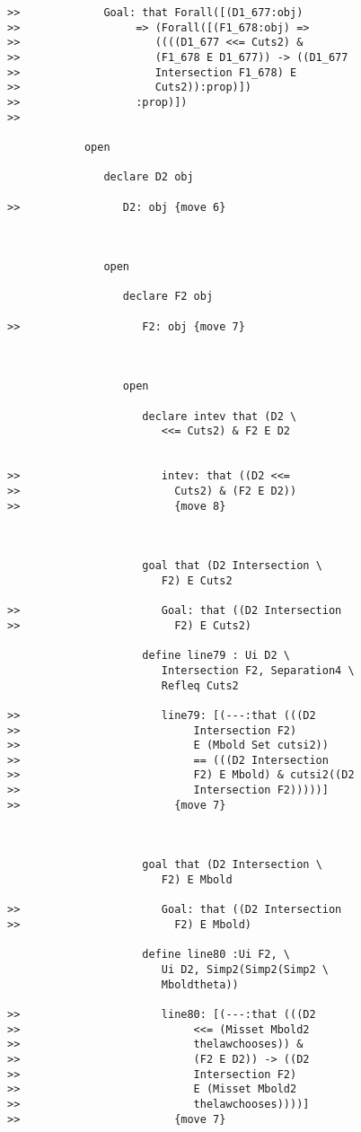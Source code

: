\documentclass[12pt]{article}
\begin{document}
\begin{verbatim}
>>             Goal: that Forall([(D1_677:obj)
>>                  => (Forall([(F1_678:obj) =>
>>                     ((((D1_677 <<= Cuts2) &
>>                     (F1_678 E D1_677)) -> ((D1_677
>>                     Intersection F1_678) E
>>                     Cuts2)):prop)])
>>                  :prop)])
>>               

            open

               declare D2 obj

>>                D2: obj {move 6}



               open

                  declare F2 obj

>>                   F2: obj {move 7}



                  open

                     declare intev that (D2 \
                        <<= Cuts2) & F2 E D2


>>                      intev: that ((D2 <<=
>>                        Cuts2) & (F2 E D2))
>>                        {move 8}



                     goal that (D2 Intersection \
                        F2) E Cuts2

>>                      Goal: that ((D2 Intersection
>>                        F2) E Cuts2)

                     define line79 : Ui D2 \
                        Intersection F2, Separation4 \
                        Refleq Cuts2

>>                      line79: [(---:that (((D2
>>                           Intersection F2)
>>                           E (Mbold Set cutsi2))
>>                           == (((D2 Intersection
>>                           F2) E Mbold) & cutsi2((D2
>>                           Intersection F2)))))]
>>                        {move 7}



                     goal that (D2 Intersection \
                        F2) E Mbold

>>                      Goal: that ((D2 Intersection
>>                        F2) E Mbold)

                     define line80 :Ui F2, \
                        Ui D2, Simp2(Simp2(Simp2 \
                        Mboldtheta))

>>                      line80: [(---:that (((D2
>>                           <<= (Misset Mbold2
>>                           thelawchooses)) &
>>                           (F2 E D2)) -> ((D2
>>                           Intersection F2)
>>                           E (Misset Mbold2
>>                           thelawchooses))))]
>>                        {move 7}




\end{verbatim}
\end{document}
